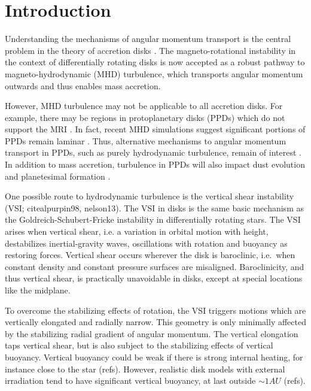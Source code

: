 \documentclass[iop]{emulateapj}
\begin{document}
\section{Introduction}\label{intro}
Understanding the mechanisms of angular momentum transport is the
central problem in the theory of accretion disks 
\citep{lyndenbell74}. The   
magneto-rotational instability in the context of differentially
rotating disks \citep[MRI,][]{balbus91} is now accepted as a robust
pathway to magneto-hydrodynamic (MHD) turbulence, which transports
angular momentum outwards and thus enables mass accretion. 

However, MHD turbulence may not be applicable to all  
accretion disks. For example, there may be regions in protoplanetary  
disks (PPDs) which do not support the MRI 
\citep{gammie96,landry13}. In fact, recent MHD simulations
suggest significant portions of PPDs remain laminar \citep[e.g.][and references
therein]{lesur14,bai15,gressel15}. Thus, alternative mechanisms 
to angular momentum transport in PPDs, such as purely hydrodynamic
turbulence,  remain of interest \citep{armitage10}. In addition to
mass accretion, turbulence in PPDs will also
impact dust evolution and planetesimal formation \citep{yl07, chiang10}. 

One possible route to hydrodynamic turbulence is the vertical shear
instability (VSI; citealp{urpin98, nelson13}).  The VSI  in disks is the same
basic mechanism as the Goldreich-Schubert-Fricke instability 
\citep[GSFI,][]{goldreich67,fricke68} in differentially rotating stars.   
The VSI arises when vertical shear, i.e. a variation in orbital motion with 
height, destabilizes inertial-gravity waves, oscillations 
with rotation and buoyancy as restoring forces.  Vertical shear
occurs wherever the disk is baroclinic, i.e.\ when constant 
density and constant pressure surfaces are misaligned.  Baroclinicity, and thus vertical shear, is 
practically unavoidable in disks, except at special locations like the midplane.

To overcome the stabilizing effects of rotation, the VSI triggers motions which are vertically elongated 
and radially narrow.  This geometry is only minimally affected by the stabilizing radial gradient of angular momentum.
The vertical elongation taps vertical shear, but is also subject to the stabilizing effects of vertical buoyancy.
Vertical buoyancy could be weak if there is strong internal heating, for instance close to the star (refs).  However, 
realistic disk models with external irradiation tend to have significant vertical buoyancy, at last outside $\sim 1 AU$ (refs).
\end{document}
